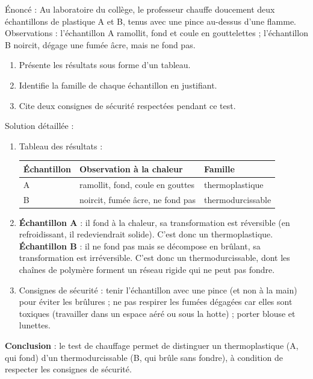 \documentclass[11pt]{article}
\newcommand{\cle}[1]{{\popxbold\color{popdark}#1}}
\begin{document}
\begin{exoresolu}
Énoncé : Au laboratoire du collège, le professeur chauffe doucement deux échantillons de plastique A et B, tenus avec une pince au-dessus d'une flamme. Observations : l'échantillon A ramollit, fond et coule en gouttelettes ; l'échantillon B noircit, dégage une fumée âcre, mais ne fond pas.
\begin{enumerate}
\item Présente les résultats sous forme d'un tableau.
\item Identifie la famille de chaque échantillon en justifiant.
\item Cite deux consignes de sécurité respectées pendant ce test.
\end{enumerate}
\tcblower
Solution détaillée :
\begin{enumerate}
\item Tableau des résultats :
\begin{center}
\begin{tabular}{|l|l|l|}
\hline
\rowcolor{popblueL} Échantillon & Observation à la chaleur & Famille \\
\hline
A & ramollit, fond, coule en gouttes & thermoplastique \\
\hline
B & noircit, fumée âcre, ne fond pas & thermodurcissable \\
\hline
\end{tabular}
\end{center}
\item \textbf{Échantillon A} : il fond à la chaleur, sa transformation est réversible (en refroidissant, il redeviendrait solide). C'est donc un \cle{thermoplastique}. \textbf{Échantillon B} : il ne fond pas mais se décompose en brûlant, sa transformation est irréversible. C'est donc un \cle{thermodurcissable}, dont les chaînes de polymère forment un réseau rigide qui ne peut pas fondre.
\item Consignes de sécurité : tenir l'échantillon avec une \cle{pince} (et non à la main) pour éviter les brûlures ; ne pas \cle{respirer les fumées} dégagées car elles sont toxiques (travailler dans un espace aéré ou sous la hotte) ; porter blouse et lunettes.
\end{enumerate}
\textbf{Conclusion} : le test de chauffage permet de distinguer un thermoplastique (A, qui fond) d'un thermodurcissable (B, qui brûle sans fondre), à condition de respecter les consignes de sécurité.
\end{exoresolu}
\end{document}
